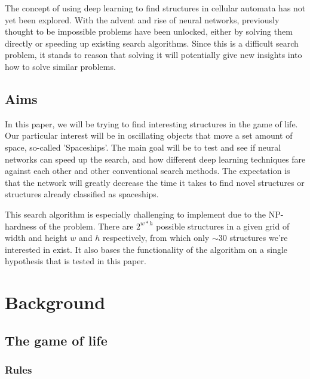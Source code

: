 \documentclass{l4proj}
\begin{document}
The concept of using deep learning to find structures in cellular automata has not yet been explored. With the advent and rise of neural networks, previously thought to be impossible problems have been unlocked, either by solving them directly or speeding up existing search algorithms. Since this is a difficult search problem, it stands to reason that solving it will potentially give new insights into how to solve similar problems.

\section{Aims}

In this paper, we will be trying to find interesting structures in the game of life. Our particular interest will be in oscillating objects that move a set amount of space, so-called 'Spaceships'. The main goal will be to test and see if neural networks can speed up the search, and how different deep learning techniques fare against each other and other conventional search methods. The expectation is that the network will greatly decrease the time it takes to find novel structures or structures already classified as spaceships.

This search algorithm is especially challenging to implement due to the NP-hardness of the problem. There are $2^{w * h}$ possible structures in a given grid of width and height $w$ and $h$ respectively, from which only $\sim{30}$ structures we're interested in exist. It also bases the functionality of the algorithm on a single hypothesis that is tested in this paper. 


\chapter{Background}

\section{The game of life}

\subsection{Rules}
\end{document}
